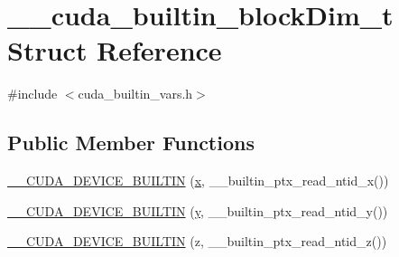 \hypertarget{struct____cuda__builtin__blockDim__t}{\section{\-\_\-\-\_\-cuda\-\_\-builtin\-\_\-block\-Dim\-\_\-t Struct Reference}
\label{struct____cuda__builtin__blockDim__t}
}


{\ttfamily \#include $<$cuda\-\_\-builtin\-\_\-vars.\-h$>$}

\subsection*{Public Member Functions}
\begin{DoxyCompactItemize}
\item 
\hyperlink{struct____cuda__builtin__blockDim__t_a695f29b5738479ec4127cbd8103f9d0a}{\-\_\-\-\_\-\-C\-U\-D\-A\-\_\-\-D\-E\-V\-I\-C\-E\-\_\-\-B\-U\-I\-L\-T\-I\-N} (\hyperlink{OWGeneric__SensorStation_8ino_ad0da36b2558901e21e7a30f6c227a45e}{x}, \-\_\-\-\_\-builtin\-\_\-ptx\-\_\-read\-\_\-ntid\-\_\-x())
\item 
\hyperlink{struct____cuda__builtin__blockDim__t_a5c60372a107737979ade4ae111473ee7}{\-\_\-\-\_\-\-C\-U\-D\-A\-\_\-\-D\-E\-V\-I\-C\-E\-\_\-\-B\-U\-I\-L\-T\-I\-N} (\hyperlink{OWGeneric__SensorStation_8ino_aa4f0d3eebc3c443f9be81bf48561a217}{y}, \-\_\-\-\_\-builtin\-\_\-ptx\-\_\-read\-\_\-ntid\-\_\-y())
\item 
\hyperlink{struct____cuda__builtin__blockDim__t_a97652ade4a899687fbad2a8099e774ad}{\-\_\-\-\_\-\-C\-U\-D\-A\-\_\-\-D\-E\-V\-I\-C\-E\-\_\-\-B\-U\-I\-L\-T\-I\-N} (z, \-\_\-\-\_\-builtin\-\_\-ptx\-\_\-read\-\_\-ntid\-\_\-z())
\end{DoxyCompactItemize}


